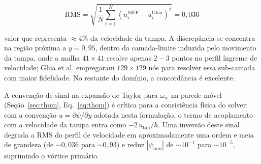 \begin{equation}
    \mathrm{RMS} = \sqrt{\frac{1}{N} \sum_{i=1}^{N} \left( u_i^{\text{MEF}} - u_i^{\text{Ghia}} \right)^2} = 0{,}036
    \label{eq:val_ns_rms}
\end{equation}

\noindent valor que representa $\approx 4\%$ da velocidade da tampa. A discrepância se concentra na região próxima a $y = 0{,}95$, dentro da camada-limite induzida pelo movimento da tampa, onde a malha $41 \times 41$ resolve apenas $2{-}3$ pontos no perfil íngreme de velocidade; Ghia et al. empregaram $129 \times 129$ nós para resolver essa sub-camada com maior fidelidade. No restante do domínio, a concordância é excelente.

A convenção de sinal na expansão de Taylor para $\omega_w$ na parede móvel (Seção~\ref{sec:thom}, Eq.~\ref{eq:thom}) é crítica para a consistência física do solver: com a convenção $u = \partial\psi / \partial y$ adotada nesta formulação, o termo de acoplamento com a velocidade da tampa entra como $-2\,u_{\mathrm{tan}}/h$. Uma inversão deste sinal degrada a RMS do perfil de velocidade em aproximadamente uma ordem e meia de grandeza (de $\sim 0{,}036$ para $\sim 0{,}93$) e reduz $|\psi_{\min}|$ de $\sim 10^{-1}$ para $\sim 10^{-5}$, suprimindo o vórtice primário.
